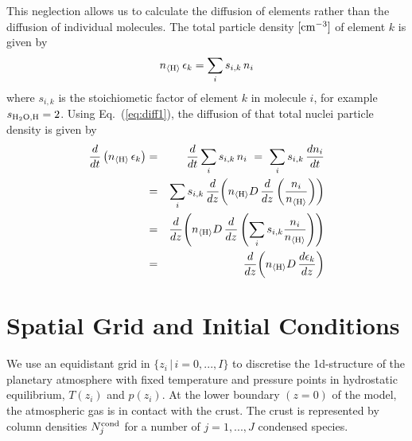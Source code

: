 \documentclass[11pt]{article}
\def\nH{n_{\langle\rm H\rangle}}
\def\ek{\epsilon_k}
\begin{document}
This neglection allows us to calculate the diffusion of elements
rather than the diffusion of individual molecules.
The total particle density $\rm[cm^{-3}]$ of element $k$ is given by 
\begin{equation}
  \nH\,\ek = \sum_i s_{i,k}\,n_i
\end{equation} 
where $s_{i,k}$ is the stoichiometic factor of element $k$ in molecule
$i$, for example $s_{\rm H_2O,H}=2$. Using Eq.~(\ref{eq:diff1}), the
diffusion of that total nuclei particle density is given by
\begin{eqnarray}
  \frac{d}{dt}\left(\nH\,\ek\right)
  &=& \frac{d}{dt}\sum_i s_{i,k}\,n_i
  ~=~ \sum_i s_{i,k}\,\frac{dn_i}{dt} \\
  &=& \sum_i s_{i,k}\,\frac{d}{dz}\!\left(\nH D\,\frac{d}{dz}
                     \left(\frac{n_i}{\nH}\right)\right) \\
  &=& \frac{d}{dz}\!\left(\nH D\,\frac{d}{dz}\left(\sum_i s_{i,k}
  \frac{n_i}{\nH}\right)\right) \\
  &=& \frac{d}{dz}\!\left(\nH D\,\frac{d\ek}{dz}\right)
\end{eqnarray}




\section{Spatial Grid and Initial Conditions}

We use an equidistant grid in $\{z_i\,|\,i\!=\!0,...,I\}$ to
discretise the 1d-structure of the planetary atmosphere with fixed
temperature and pressure points in hydrostatic equilibrium, $T(z_i)$
and $p(z_i)$.  At the lower boundary $(z=0)$ of the model, the
atmospheric gas is in contact with the crust. The crust is represented
by column densities $N_j^{\rm cond}$ for a number of $j=1,...,J$
condensed species.
\end{document}
